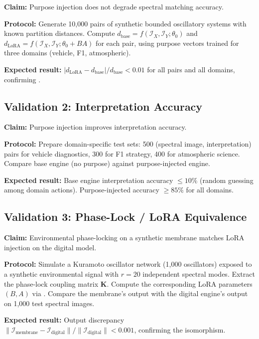 \documentclass[11pt,twocolumn,a4paper]{article}
\theoremstyle{definition}
\theoremstyle{remark}
\begin{document}
\textbf{Claim:} Purpose injection does not degrade spectral matching accuracy.

\textbf{Protocol:} Generate 10,000 pairs of synthetic bounded oscillatory systems with known partition distances.  Compute $d_{\mathrm{base}} = f(\mathcal{I}_X, \mathcal{I}_Y; \theta_0)$ and $d_{\mathrm{LoRA}} = f(\mathcal{I}_X, \mathcal{I}_Y; \theta_0 + BA)$ for each pair, using purpose vectors trained for three domains (vehicle, F1, atmospheric).

\textbf{Expected result:} $|d_{\mathrm{LoRA}} - d_{\mathrm{base}}| / d_{\mathrm{base}} < 0.01$ for all pairs and all domains, confirming .

\subsection{Validation 2: Interpretation Accuracy}

\textbf{Claim:} Purpose injection improves interpretation accuracy.

\textbf{Protocol:} Prepare domain-specific test sets: 500 (spectral image, interpretation) pairs for vehicle diagnostics, 300 for F1 strategy, 400 for atmospheric science.  Compare base engine (no purpose) against purpose-injected engine.

\textbf{Expected result:} Base engine interpretation accuracy $\leq 10\%$ (random guessing among domain actions).  Purpose-injected accuracy $\geq 85\%$ for all domains.

\subsection{Validation 3: Phase-Lock / LoRA Equivalence}

\textbf{Claim:} Environmental phase-locking on a synthetic membrane matches LoRA injection on the digital model.

\textbf{Protocol:} Simulate a Kuramoto oscillator network (1,000 oscillators) exposed to a synthetic environmental signal with $r = 20$ independent spectral modes.  Extract the phase-lock coupling matrix $\mathbf{K}$.  Compute the corresponding LoRA parameters $(B, A)$ via .  Compare the membrane's output with the digital engine's output on 1,000 test spectral images.

\textbf{Expected result:} Output discrepancy $\|\mathcal{I}_{\mathrm{membrane}} - \mathcal{I}_{\mathrm{digital}}\| / \|\mathcal{I}_{\mathrm{digital}}\| < 0.001$, confirming the isomorphism.
\end{document}
